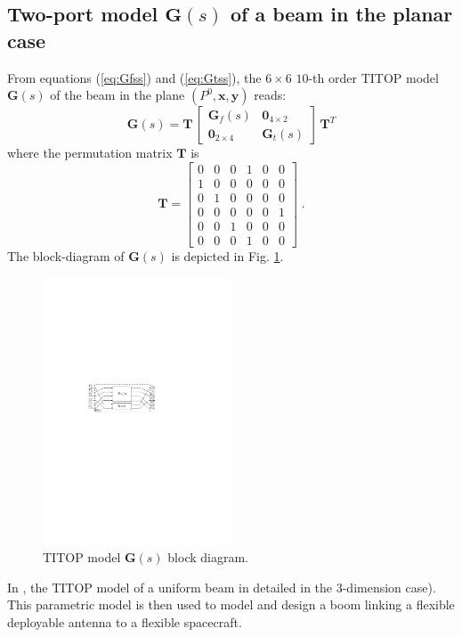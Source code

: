 \documentclass[smallcondensed]{svjour3}     %
\begin{document}
\subsection{Two-port model $\mathbf{G}(s)$ of a beam in the planar case}
From equations (\ref{eq:Gfss}) and (\ref{eq:Gtss}), the $6\times 6$ $10$-th order TITOP model $\mathbf{G}(s)$ of the beam in the plane $(P^0,\mathbf{x},\mathbf{y})$ reads:
\begin{equation}\label{eq:Gss}
\mathbf{G}(s)=\mathbf{T}\,\left[\begin{array}{cc}\mathbf{G}_f(s) & \mathbf{0}_{4\times 2}\\\mathbf{0}_{2\times 4}& \mathbf{G}_t(s) \end{array}\right]\,\mathbf{T}^T
\end{equation}
where the permutation matrix $\mathbf{T}$ is
\[
\mathbf{T}=\left[\begin{array}{cccccc}
0 & 0 & 0 & 1 & 0 & 0\\ 1 & 0 & 0 & 0 & 0 & 0\\
0 & 1 & 0 & 0 & 0 & 0\\ 0 & 0 & 0 & 0 & 0 & 1\\
0 & 0 & 1 & 0 & 0 & 0\\ 0 & 0 & 0 & 1 & 0 & 0
\end{array}\right]\;.
\]
The block-diagram of $\mathbf{G}(s)$ is depicted in Fig. \ref{fig:G}.
\begin{figure}[htbp!]
  \includegraphics[width=0.5\textwidth]{Gb}
\caption{TITOP model $\mathbf{G}(s)$ block diagram.}
\label{fig:G} 
\end{figure}

In \cite{Murali2015}, the TITOP model of a uniform beam in detailed in the $3$-dimension case). This parametric model is then used to model and design a boom linking a flexible deployable antenna to a flexible spacecraft.
\end{document}
